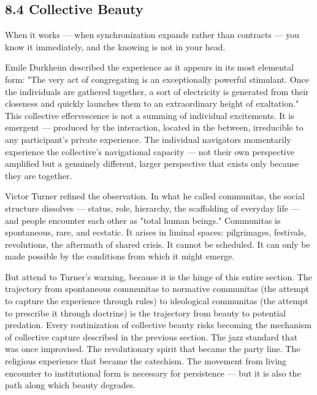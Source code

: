 \bigskip\noindent\makebox[\textwidth]{\color{rulegray}\rule{5cm}{0.3pt}}\bigskip


\subsection*{8.4 Collective Beauty}


When it works — when synchronization expands rather than contracts — you know it immediately, and the knowing is not in your head.


Emile Durkheim described the experience as it appears in its most elemental form: "The very act of congregating is an exceptionally powerful stimulant. Once the individuals are gathered together, a sort of electricity is generated from their closeness and quickly launches them to an extraordinary height of exaltation." This collective effervescence is not a summing of individual excitements. It is emergent — produced by the interaction, located in the between, irreducible to any participant's private experience. The individual navigators momentarily experience the collective's navigational capacity — not their own perspective amplified but a genuinely different, larger perspective that exists only because they are together.


Victor Turner refined the observation. In what he called communitas, the social structure dissolves — status, role, hierarchy, the scaffolding of everyday life — and people encounter each other as "total human beings." Communitas is spontaneous, rare, and ecstatic. It arises in liminal spaces: pilgrimages, festivals, revolutions, the aftermath of shared crisis. It cannot be scheduled. It can only be made possible by the conditions from which it might emerge.


But attend to Turner's warning, because it is the hinge of this entire section. The trajectory from spontaneous communitas to normative communitas (the attempt to capture the experience through rules) to ideological communitas (the attempt to prescribe it through doctrine) is the trajectory from beauty to potential predation. Every routinization of collective beauty risks becoming the mechanism of collective capture described in the previous section. The jazz standard that was once improvised. The revolutionary spirit that became the party line. The religious experience that became the catechism. The movement from living encounter to institutional form is necessary for persistence — but it is also the path along which beauty degrades.


